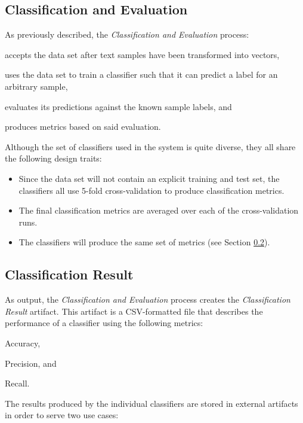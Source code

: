 \documentclass[conference]{sig-alternate-05-2015}
\begin{document}
\subsection{Classification and Evaluation}\label{subsec:classification}
As previously described, the \textit{Classification and Evaluation} process:
\begin{enumerate*}[(1)]
  \item accepts the data set after text samples have been transformed into
  vectors,
  \item uses the data set to train a classifier such that it can predict a label
  for an arbitrary sample,
  \item evaluates its predictions against the known sample labels, and
  \item produces metrics based on said evaluation.
\end{enumerate*}\par

Although the set of classifiers used in the system is quite diverse, they all
share the following design traits:
\begin{itemize}
  \item Since the data set will not contain an explicit training and test set,
  the classifiers all use 5-fold cross-validation to produce classification
  metrics.
  \item The final classification metrics are averaged over each of the
  cross-validation runs.
  \item The classifiers will produce the same set of metrics (see Section
  \ref{subsec:classification_result}).
\end{itemize}

\subsection{Classification Result}\label{subsec:classification_result}
As output, the \textit{Classification and Evaluation} process creates the
\textit{Classification Result} artifact. This artifact is a CSV-formatted file
that describes the performance of a classifier using the following metrics:
\begin{enumerate*}[(1)]
  \item Accuracy,
  \item Precision, and
  \item Recall.
\end{enumerate*}

The results produced by the individual classifiers are stored in external
artifacts in order to serve two use cases:
\end{document}
